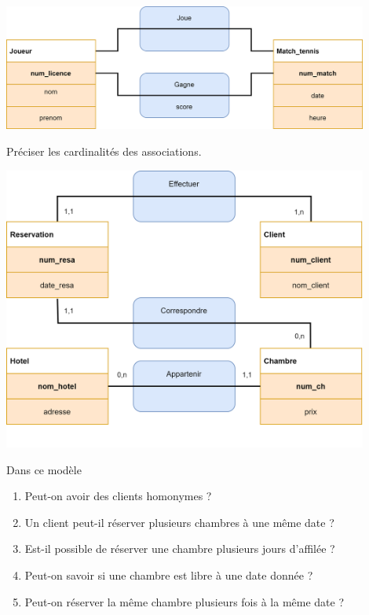 \begin{exercice}[]
    \begin{center}
        \includegraphics[width=12cm]{img/ex2}
    \end{center}
    Préciser les cardinalités des associations.
\end{exercice}
\newpage

\begin{exercice}[]
    \begin{center}
        \includegraphics[width=12cm]{img/ex_hotel}
    \end{center}
    Dans ce modèle
    \begin{enumerate}
        \item 	Peut-on avoir des clients homonymes ?
        \item 	Un client peut-il réserver plusieurs chambres à une même date ?
        \item 	Est-il possible de réserver une chambre plusieurs jours d'affilée ?
        \item 	Peut-on savoir si une chambre est libre à une date donnée ?
        \item 	Peut-on réserver la même chambre plusieurs fois à la même date ?
    \end{enumerate}
\end{exercice}
